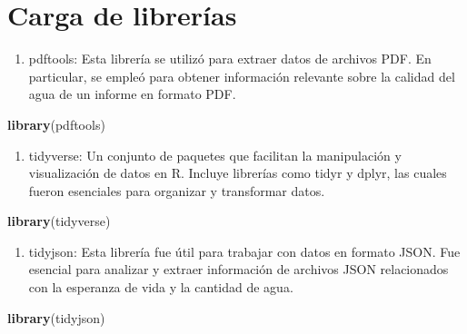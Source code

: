 \documentclass[
]{article}
\newenvironment{Shaded}{\begin{snugshade}}{\end{snugshade}}
\newcommand{\FunctionTok}[1]{\textcolor[rgb]{0.13,0.29,0.53}{\textbf{#1}}}
\newcommand{\NormalTok}[1]{#1}
\providecommand{\tightlist}{%
  \setlength{\itemsep}{0pt}\setlength{\parskip}{0pt}}
\begin{document}
\hypertarget{carga-de-libreruxedas}{%
\section{Carga de librerías}\label{carga-de-libreruxedas}}

\begin{enumerate}
\def\labelenumi{\arabic{enumi}.}
\tightlist
\item
  pdftools: Esta librería se utilizó para extraer datos de archivos PDF.
  En particular, se empleó para obtener información relevante sobre la
  calidad del agua de un informe en formato PDF.
\end{enumerate}

\begin{Shaded}
\begin{Highlighting}[]
\FunctionTok{library}\NormalTok{(pdftools)}
\end{Highlighting}
\end{Shaded}

\begin{enumerate}
\def\labelenumi{\arabic{enumi}.}
\setcounter{enumi}{1}
\tightlist
\item
  tidyverse: Un conjunto de paquetes que facilitan la manipulación y
  visualización de datos en R. Incluye librerías como tidyr y dplyr, las
  cuales fueron esenciales para organizar y transformar datos.
\end{enumerate}

\begin{Shaded}
\begin{Highlighting}[]
\FunctionTok{library}\NormalTok{(tidyverse)}
\end{Highlighting}
\end{Shaded}

\begin{enumerate}
\def\labelenumi{\arabic{enumi}.}
\setcounter{enumi}{2}
\tightlist
\item
  tidyjson: Esta librería fue útil para trabajar con datos en formato
  JSON. Fue esencial para analizar y extraer información de archivos
  JSON relacionados con la esperanza de vida y la cantidad de agua.
\end{enumerate}

\begin{Shaded}
\begin{Highlighting}[]
\FunctionTok{library}\NormalTok{(tidyjson)}
\end{Highlighting}
\end{Shaded}
\end{document}
